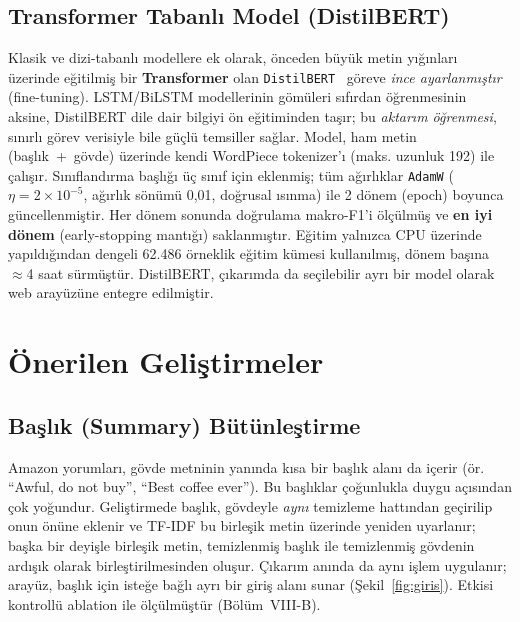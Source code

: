 \documentclass[conference]{IEEEtran}
\begin{document}
\subsection{Transformer Tabanlı Model (DistilBERT)}
Klasik ve dizi-tabanlı modellere ek olarak, önceden büyük metin yığınları üzerinde
eğitilmiş bir \textbf{Transformer} olan \texttt{DistilBERT}~\cite{distilbert} göreve
\emph{ince ayarlanmıştır} (fine-tuning). LSTM/BiLSTM modellerinin gömüleri sıfırdan
öğrenmesinin aksine, DistilBERT dile dair bilgiyi ön eğitiminden taşır; bu
\emph{aktarım öğrenmesi}, sınırlı görev verisiyle bile güçlü temsiller sağlar.
Model, ham metin (başlık~+~gövde) üzerinde kendi WordPiece tokenizer'ı (maks.
uzunluk 192) ile çalışır. Sınıflandırma başlığı üç sınıf için eklenmiş; tüm ağırlıklar
\texttt{AdamW} ($\eta=2\times10^{-5}$, ağırlık sönümü 0,01, doğrusal ısınma) ile
2 dönem (epoch) boyunca güncellenmiştir. Her dönem sonunda doğrulama makro-F1'i
ölçülmüş ve \textbf{en iyi dönem} (early-stopping mantığı) saklanmıştır. Eğitim
yalnızca CPU üzerinde yapıldığından dengeli 62.486 örneklik eğitim kümesi
kullanılmış, dönem başına $\approx$4 saat sürmüştür. DistilBERT, çıkarımda da
seçilebilir ayrı bir model olarak web arayüzüne entegre edilmiştir.

\section{Önerilen Geliştirmeler}
\subsection{Başlık (Summary) Bütünleştirme}
Amazon yorumları, gövde metninin yanında kısa bir başlık alanı da içerir (ör.
``Awful, do not buy'', ``Best coffee ever''). Bu başlıklar çoğunlukla duygu
açısından çok yoğundur. Geliştirmede başlık, gövdeyle \emph{aynı} temizleme
hattından geçirilip onun önüne eklenir ve TF-IDF bu birleşik metin üzerinde
yeniden uyarlanır; başka bir deyişle birleşik metin, temizlenmiş başlık ile
temizlenmiş gövdenin ardışık olarak birleştirilmesinden oluşur. Çıkarım anında da
aynı işlem uygulanır; arayüz, başlık için isteğe bağlı ayrı bir
giriş alanı sunar (Şekil~\ref{fig:giris}). Etkisi kontrollü ablation ile
ölçülmüştür (Bölüm~VIII-B).
\end{document}
